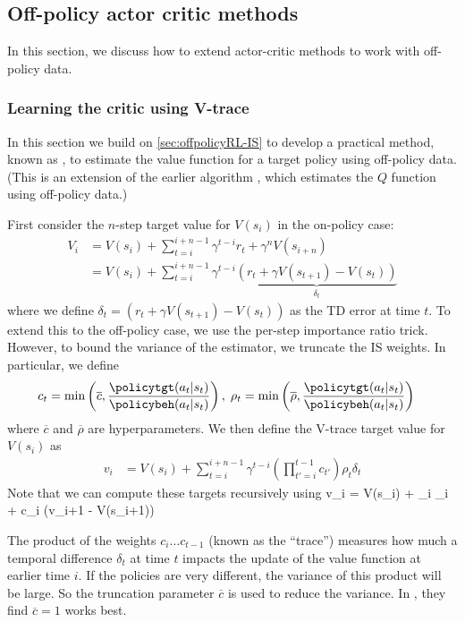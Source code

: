 \subsection{Off-policy actor critic methods}
\label{sec:offPolicyPG}

In this section, we discuss how to extend actor-critic
methods to work with off-policy data.

\subsubsection{Learning the critic using V-trace}
\label{sec:Vtrace}

In this section
we build on \cref{sec:offpolicyRL-IS} to develop a practical method,
known as  \citep{Espeholt2018},
to estimate the value function for a target policy
using off-policy data.
(This is an extension of the earlier
 algorithm \citep{Munos16},
which estimates the $Q$ function using off-policy data.)

First consider the $n$-step target value for $V(s_i)$
in the on-policy case:
\begin{align}
  V_i  &= V(s_i)
  + \sum_{t=i}^{i+n-1} \gamma^{t-i} r_t + \gamma^n V(s_{i+n}) \\
  &= V(s_i)
  + \sum_{t=i}^{i+n-1} \gamma^{t-i}
  \underbrace{(r_t + \gamma V(s_{t+1}) - V(s_t))}_{\delta_t}
\end{align}
where we define $\delta_t  = (r_t + \gamma V(s_{t+1}) - V(s_t))$
as the TD error at time $t$.
To extend this to the off-policy case, we use the per-step
importance ratio trick. However, to bound the variance
of the estimator, we truncate the IS weights.
In particular, we define
\begin{align}
  c_t &= \min\left(\overline{c},
  \frac{\policytgt(a_t|s_t)}{\policybeh(a_t|s_t)} \right),
  \;
  \rho_t = \min\left(\overline{\rho},
  \frac{\policytgt(a_t|s_t)}{\policybeh(a_t|s_t)} \right) 
\end{align}
where $\overline{c}$ and $\overline{\rho}$
are hyperparameters.
We then define the V-trace target value for $V(s_i)$ as
\begin{align}
  v_i
  &= V(s_i)
  + \sum_{t=i}^{i+n-1} \gamma^{t-i} \left( \prod_{t'=i}^{t-1} c_{t'}
  \right)   \rho_t \delta_t
\end{align}
Note that we can compute these targets recursively using
\be
v_i = V(s_i) + \rho_i  \delta_i + \gamma c_i (v_{i+1} - V(s_{i+1}))
\ee

The product of the weights $c_i \ldots c_{t-1}$ (known as the ``trace'')
measures how much a temporal difference $\delta_t$
at time $t$ impacts the update of the value function
at earlier time $i$.
If the policies are very different, the variance of this product
will be large. So the truncation parameter $\overline{c}$
is used to reduce the variance.
In  \citep{Espeholt2018}, they find $\overline{c}=1$ works best.

